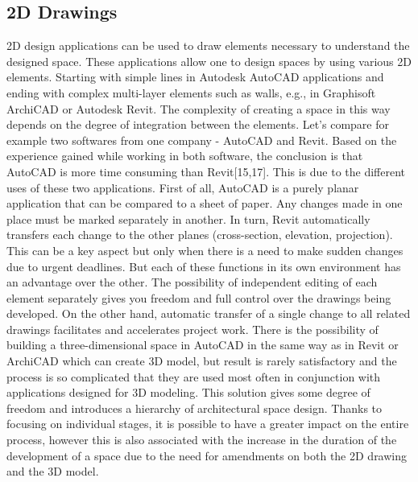 \documentclass[runningheads]{llncs}
\begin{document}
\subsection{2D Drawings}
2D design applications can be used to draw elements necessary to understand the designed space. These applications allow one to design spaces by using various 2D elements. Starting with simple lines in Autodesk AutoCAD applications and ending with complex multi-layer elements such as walls, e.g., in Graphisoft ArchiCAD or Autodesk Revit. The complexity of creating a space in this way depends on the degree of integration between the elements. Let's compare for example two softwares from one company - AutoCAD and Revit. Based on the experience gained while working in both software, the conclusion is that AutoCAD is more time consuming than Revit[15,17]. This is due to the different uses of these two applications. First of all, AutoCAD is a purely planar application that can be compared to a sheet of paper. Any changes made in one place must be marked separately in another. In turn, Revit automatically transfers each change to the other planes (cross-section, elevation, projection). This can be a key aspect but only when there is a need to make sudden changes due to urgent deadlines. But each of these functions in its own environment has an advantage over the other. The possibility of independent editing of each element separately gives you freedom and full control over the drawings being developed. On the other hand, automatic transfer of a single change to all related drawings facilitates and accelerates project work. There is the possibility of building a three-dimensional space in AutoCAD in the same way as in Revit or ArchiCAD which can create 3D model, but result is rarely satisfactory and the process is so complicated that they are used most often in conjunction with applications designed for 3D modeling. This solution gives some degree of freedom and introduces a hierarchy of architectural space design. Thanks to focusing on individual stages, it is possible to have a greater impact on the entire process, however this is also associated with the increase in the duration of the development of a space due to the need for amendments on both the 2D drawing and the 3D model.
\end{document}
